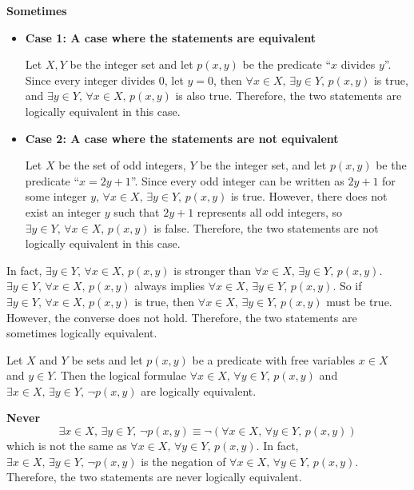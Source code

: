 \begin{mysolution}
    \textbf{Sometimes}

    \begin{itemize}
        \item \textbf{Case 1: A case where the statements are equivalent}
        
        Let $X, Y$ be the integer set and let $p(x,y)$ be the predicate ``$x$ divides $y$''. Since every integer divides $0$, let $y = 0$, then $\forall x \in X,\, \exists y \in Y,\, p(x,y)$ is true, and $\exists y \in Y,\, \forall x \in X,\, p(x,y)$ is also true. Therefore, the two statements are logically equivalent in this case.
        \item \textbf{Case 2: A case where the statements are not equivalent}
        
        Let $X$ be the set of odd integers, $Y$ be the integer set, and let $p(x,y)$ be the predicate ``$x=2y+1$''. Since every odd integer can be written as $2y+1$ for some integer $y$, $\forall x \in X,\, \exists y \in Y,\, p(x,y)$ is true. However, there does not exist an integer $y$ such that $2y+1$ represents all odd integers, so $\exists y \in Y,\, \forall x \in X,\, p(x,y)$ is false. Therefore, the two statements are not logically equivalent in this case.
    \end{itemize}
    In fact, $\exists y \in Y,\, \forall x \in X,\, p(x,y)$ is stronger than $\forall x \in X,\, \exists y \in Y,\, p(x,y)$. $\exists y \in Y,\, \forall x \in X,\, p(x,y)$ always implies $\forall x \in X,\, \exists y \in Y,\, p(x,y)$. So if $\exists y \in Y,\, \forall x \in X,\, p(x,y)$ is true, then $\forall x \in X,\, \exists y \in Y,\, p(x,y)$ must be true. However, the converse does not hold. Therefore, the two statements are sometimes logically equivalent.
\end{mysolution}

\begin{chapex} %
\label{cqLogicASNEnd}
Let $X$ and $Y$ be sets and let $p(x,y)$ be a predicate with free variables $x \in X$ and $y \in Y$. Then the logical formulae $\forall x \in X,\, \forall y \in Y,\, p(x,y)$ and $\exists x \in X,\, \exists y \in Y,\, \neg p(x,y)$ are logically equivalent.
\end{chapex}

\begin{mysolution}
    \textbf{Never}
    \[\exists x \in X,\, \exists y \in Y,\, \neg p(x,y) \equiv \neg (\forall x \in X,\, \forall y \in Y,\, p(x,y))\]
    which is not the same as $\forall x \in X,\, \forall y \in Y,\, p(x,y)$. In fact, $\exists x \in X,\, \exists y \in Y,\, \neg p(x,y)$ is the negation of $\forall x \in X,\, \forall y \in Y,\, p(x,y)$. Therefore, the two statements are never logically equivalent.
\end{mysolution}